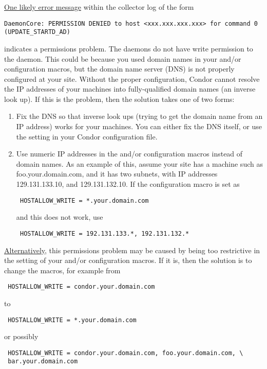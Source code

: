 \underline{One likely error message} within the collector log of the form
\footnotesize
\begin{verbatim}
DaemonCore: PERMISSION DENIED to host <xxx.xxx.xxx.xxx> for command 0 (UPDATE_STARTD_AD)
\end{verbatim}
\normalsize
indicates a permissions problem.
The  daemons do not have write permission to the
 daemon.
This could be because
you used domain names in your  and/or
 configuration macros,
but the domain name server (DNS) is not properly configured at your site.
Without the proper configuration, Condor cannot resolve
the IP addresses of your machines
into fully-qualified domain names (an inverse look up).
If this is the problem, then the solution takes one of two forms:
\begin{enumerate}
\item Fix the DNS so that inverse look ups (trying to get the domain name
   from an IP address) works for your machines.  You can
   either fix the DNS itself,
   or use the  setting in your Condor
         configuration file.
\item Use numeric IP addresses in the  and/or
    configuration macros
   instead of domain names.
   As an example of this, assume your site has a machine such as
   foo.your.domain.com, and it has two subnets, with IP addresses
   129.131.133.10, and 129.131.132.10.
   If the configuration macro is set as 

\begin{verbatim}
 HOSTALLOW_WRITE = *.your.domain.com
\end{verbatim}

   and this does not work, use

\begin{verbatim}
 HOSTALLOW_WRITE = 192.131.133.*, 192.131.132.*
\end{verbatim}
\end{enumerate}

\underline{Alternatively}, this permissions problem
may be caused by being too restrictive in the setting of
your  and/or
 configuration macros.
If it is, then the solution is to change the macros,
for example from
\begin{verbatim}
 HOSTALLOW_WRITE = condor.your.domain.com
\end{verbatim}
to
\begin{verbatim}
 HOSTALLOW_WRITE = *.your.domain.com
\end{verbatim}
or possibly
\footnotesize
\begin{verbatim}
 HOSTALLOW_WRITE = condor.your.domain.com, foo.your.domain.com, \
 bar.your.domain.com 
\end{verbatim}
\normalsize


